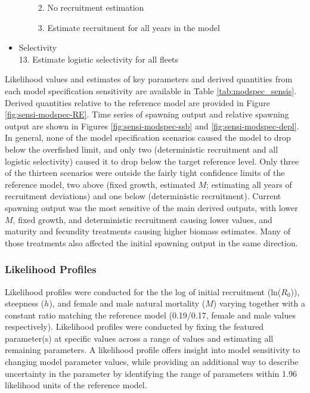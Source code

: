 \documentclass[11pt,
  letterpaper,
]{article}
\providecommand{\tightlist}{%
  \setlength{\itemsep}{0pt}\setlength{\parskip}{0pt}}
\providecommand{\tightlist}{%
  \setlength{\itemsep}{0pt}\setlength{\parskip}{0pt}}
\begin{document}
\begin{itemize}
\begin{itemize}
    \begin{enumerate}
    \def\labelenumi{\arabic{enumi}.}
    \setcounter{enumi}{10}
    \tightlist
    \item
      No recruitment estimation
    \item
      Estimate recruitment for all years in the model
    \end{enumerate}
  \end{itemize}
\item
  Selectivity\\
  13. Estimate logistic selectivity for all fleets
\end{itemize}

Likelihood values and estimates of key parameters and derived quantities from each model specification sensitivity are available in Table \ref{tab:modspec_sensis}. Derived quantities relative to the reference model are provided in Figure \ref{fig:sensi-modspec-RE}. Time series of spawning output and relative spawning output are shown in Figures \ref{fig:sensi-modspec-ssb} and \ref{fig:sensi-modspec-depl}. In general, none of the model specification scenarios caused the model to drop below the overfished limit, and only two (deterministic recruitment and all logistic selectivity) caused it to drop below the target reference level. Only three of the thirteen scenarios were outside the fairly tight confidence limits of the reference model, two above (fixed growth, estimated \(M\); estimating all years of recruitment deviations) and one below (deterministic recruitment). Current spawning output was the most sensitive of the main derived outputs, with lower \(M\), fixed growth, and deterministic recruitment causing lower values, and maturity and fecundity treatments causing higher biomass estimates. Many of those treatments also affected the initial spawning output in the same direction.

\hypertarget{likelihood-profiles-1}{%
\subsubsection{Likelihood Profiles}\label{likelihood-profiles-1}}

Likelihood profiles were conducted for the the log of initial recruitment (ln(\(R_0\))), steepness (\(h\)), and female and male natural mortality (\(M\)) varying together with a constant ratio matching the reference model (0.19/0.17, female and male values respectively). Likelihood profiles were conducted by fixing the featured parameter(s) at specific values across a range of values and estimating all remaining parameters. A likelihood profile offers insight into model sensitivity to changing model parameter values, while providing an additional way to describe uncertainty in the parameter by identifying the range of parameters within 1.96 likelihood units of the reference model.
\end{document}
